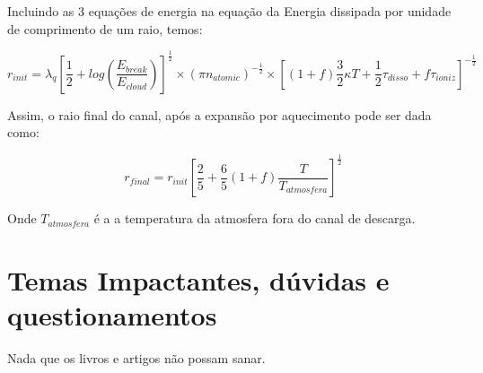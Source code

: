 \documentclass[a4paper, 12pt, onecolumn,singlespacing]{article}
\begin{document}
	Incluindo as 3 equações de energia na equação da Energia dissipada por unidade de comprimento de um raio, temos:
	
	\begin{equation}
		r_{init} = \lambda_q \left[\frac{1}{2} + log\left(\frac{E_{break}}{E_{cloud}}\right)\right]^{\frac{1}{2}} \times \left(\pi n_{atomic}\right)^{-\frac{1}{2}} \times \left[\left(1+f\right) \frac{3}{2} \kappa T + \frac{1}{2} \tau_{disso} + f\tau_{ioniz}\right]^{-\frac{1}{2}}
	\end{equation}

	Assim, o raio final do canal, após a expansão por aquecimento pode ser dada como:
	
	\begin{equation}
		r_{final} = r_{init} \left[\frac{2}{5} + \frac{6}{5} (1 + f) \frac{T}{T_{atmosfera}}\right]^{\frac{1}{2}}
	\end{equation}

	Onde $T_{atmosfera}$ é a a temperatura da atmosfera fora do canal de descarga.
	
	
	\section{Temas Impactantes, dúvidas e questionamentos}

	Nada que os livros e artigos não possam sanar.	
	
\end{document}
